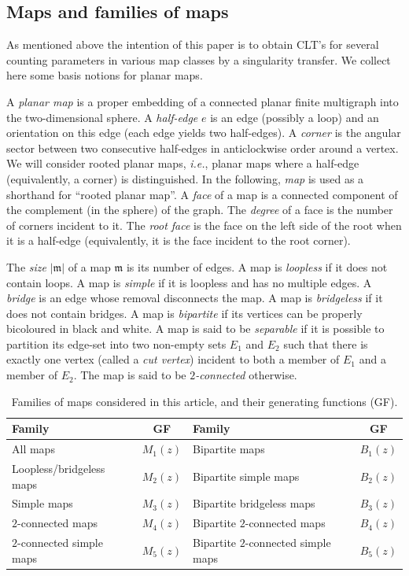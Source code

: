 \documentclass[a4paper,UKenglish,cleveref, autoref, thm-restate]{lipics-v2021}
\renewcommand{\(}{\left(}
\renewcommand{\)}{\right)}
\newcommand{\m}{\mathfrak{m}}
\begin{document}
\subsection{Maps and families of maps}
\label{subsec:defin-maps}

As mentioned above the intention of this paper is to obtain CLT's for several counting
parameters in various map classes by a singularity transfer. We collect here
some basis notions for planar maps.

A \emph{planar map} is a proper embedding of a connected planar finite multigraph into the two-dimensional sphere. A \emph{half-edge} $e$ is an edge (possibly a loop) and an orientation on this edge (each edge yields two half-edges). A \emph{corner} is the angular sector between two consecutive half-edges in anticlockwise order
around a vertex. We will consider rooted planar maps, \emph{i.e.}, planar maps where a half-edge (equivalently, a corner) is distinguished. In the following, \emph{map} is used as a shorthand for ``rooted planar map''. A \emph{face} of a map is a connected component of the complement (in the sphere) of the graph. The \emph{degree} of a face is the number of corners incident to it. The \emph{root face} is the face on the left side of the root when it is a half-edge (equivalently, it is the face incident to the root corner).

The \emph{size} $|\m|$ of a map $\m$ is its number of edges. A map is \emph{loopless} if it does not contain loops. A map is \emph{simple} if it is loopless and has no multiple edges. A \emph{bridge} is an edge whose removal disconnects the map. A map is \emph{bridgeless} if it does not contain bridges. A map is \emph{bipartite} if its vertices can be properly bicoloured in black and white. A map is said to be \emph{separable} if it is possible to partition its edge-set into two non-empty sets $E_1$ and $E_2$ such that there is exactly one vertex (called a \emph{cut vertex}) incident to both a member of $E_1$ and a member of $E_2$. The map is said to be \emph{$2$-connected} otherwise.

\begin{table}
\begin{tabular}{l | c || l | c}
Family & GF & Family & GF\\
\hline
All maps & $M_1(z)$ & Bipartite maps & $B_1(z)$ \\
Loopless/bridgeless maps & $M_2(z)$ & Bipartite simple maps & $B_2(z)$\\
Simple maps & $M_3(z)$ &Bipartite bridgeless maps & $B_3(z)$ \\
$2$-connected maps & $M_4(z)$ &Bipartite $2$-connected maps & $B_4(z)$ \\
$2$-connected simple maps & $M_5(z)$ & Bipartite $2$-connected simple maps & $B_5(z)$\\
\end{tabular}
\caption{Families of maps considered in this article, and their generating functions (GF).}
\label{tab:notation}
\end{table}
\end{document}
